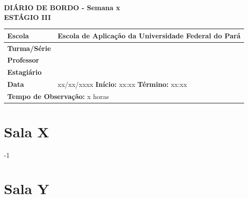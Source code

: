 \documentclass[a4paper,11pt]{article} %
\begin{document}
\begin{center}
\textbf{DIÁRIO DE BORDO - Semana x} \\
\vspace{0.5cm}
\textbf{ESTÁGIO III}
\end{center}
\begin{center}
\begin{tabular}{|l|l|}
\hline
   \textbf{Escola}  &  Escola de Aplicação da Universidade Federal do Pará \hspace{3.5cm} \\
\hline  
   \textbf{Turma/Série} & \\
\hline   
   \textbf{Professor} &  \\
\hline   
   \textbf{Estagiário} &   \\
\hline   
   \textbf{Data} & \multicolumn{1}{l|}{ xx/xx/xxxx  \vline \textbf{ Início: } xx:xx  \hspace{2.4cm} \vline \textbf{ Término: } xx:xx }\\ 
\hline   
   \multicolumn{2}{|l|}{\textbf{Tempo de Observação:} x horas} \\
\hline   
\end{tabular}
\end{center}

\section*{Sala X}
-1
\section*{Sala Y}
\lipsum[1]
\end{document}
